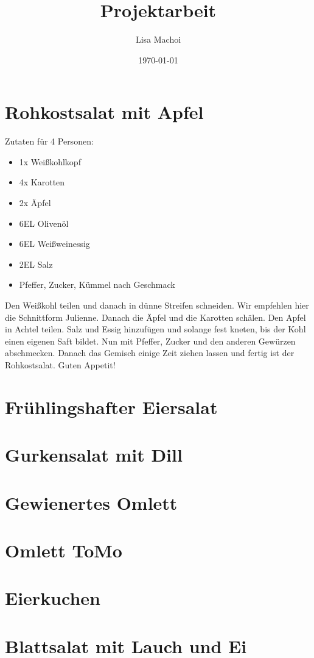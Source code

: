 \documentclass[10pt,a4paper,oneside]{article}
\begin{document}
\thispagestyle{empty}
\title{Projektarbeit}
\author{Lisa Machoi}
\date{\today}
\maketitle
\newpage
\tableofcontents
\setcounter{page}{0}
%
\newpage
\setcounter{page}{1}
\section{Rohkostsalat mit Apfel}
Zutaten für 4 Personen:
\begin{itemize}
	\item 1x Weißkohlkopf
	\item 4x Karotten
	\item 2x Äpfel
	\item 6EL Olivenöl
	\item 6EL Weißweinessig
	\item 2EL Salz
	\item Pfeffer, Zucker, Kümmel nach Geschmack
\end{itemize}
Den Weißkohl teilen und danach in dünne Streifen schneiden.
Wir empfehlen hier die Schnittform Julienne.
Danach die Äpfel und die Karotten schälen.
Den Apfel in Achtel teilen.
Salz und Essig hinzufügen und solange fest kneten, bis der Kohl einen eigenen Saft bildet.
Nun mit Pfeffer, Zucker und den anderen Gewürzen abschmecken.
Danach das Gemisch einige Zeit ziehen lassen und fertig ist der Rohkostsalat.
Guten Appetit!
%
\newpage
\section{Frühlingshafter Eiersalat}
%
\newpage
\section{Gurkensalat mit Dill}
%
\newpage
\section{Gewienertes Omlett}
%
\newpage
\section{Omlett ToMo}
%
\newpage
\section{Eierkuchen}
%
\newpage
\section{Blattsalat mit Lauch und Ei}
\end{document}
